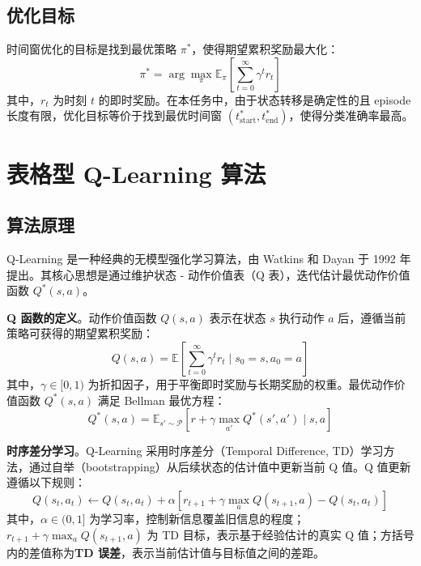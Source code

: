 \subsection{优化目标}
\label{subsec:objective}

时间窗优化的目标是找到最优策略 $\pi^*$，使得期望累积奖励最大化：
\begin{equation}
\pi^* = \arg\max_{\pi} \mathbb{E}_{\pi} \left[ \sum_{t=0}^{\infty} \gamma^t r_t \right]
\end{equation}
其中，$r_t$ 为时刻 $t$ 的即时奖励。在本任务中，由于状态转移是确定性的且 episode 长度有限，优化目标等价于找到最优时间窗 $(t_{\text{start}}^*, t_{\text{end}}^*)$，使得分类准确率最高。

\section{表格型 Q-Learning 算法}
\label{sec:qlearning}

\subsection{算法原理}
\label{subsec:algorithm}

Q-Learning 是一种经典的无模型强化学习算法，由 Watkins 和 Dayan 于 1992 年提出\cite{watkins1992q}。其核心思想是通过维护状态 - 动作价值表（Q 表），迭代估计最优动作价值函数 $Q^*(s, a)$。

\textbf{Q 函数的定义}。动作价值函数 $Q(s, a)$ 表示在状态 $s$ 执行动作 $a$ 后，遵循当前策略可获得的期望累积奖励：
\begin{equation}
Q(s, a) = \mathbb{E} \left[ \sum_{t=0}^{\infty} \gamma^t r_t \mid s_0 = s, a_0 = a \right]
\end{equation}
其中，$\gamma \in [0, 1)$ 为折扣因子，用于平衡即时奖励与长期奖励的权重。最优动作价值函数 $Q^*(s, a)$ 满足 Bellman 最优方程：
\begin{equation}
Q^*(s, a) = \mathbb{E}_{s' \sim \mathcal{P}} \left[ r + \gamma \max_{a'} Q^*(s', a') \mid s, a \right]
\end{equation}

\textbf{时序差分学习}。Q-Learning 采用时序差分（Temporal Difference, TD）学习方法，通过自举（bootstrapping）从后续状态的估计值中更新当前 Q 值。Q 值更新遵循以下规则：
\begin{equation}
Q(s_t, a_t) \leftarrow Q(s_t, a_t) + \alpha \left[ r_{t+1} + \gamma \max_{a} Q(s_{t+1}, a) - Q(s_t, a_t) \right]
\end{equation}
其中，$\alpha \in (0, 1]$ 为学习率，控制新信息覆盖旧信息的程度；$r_{t+1} + \gamma \max_{a} Q(s_{t+1}, a)$ 为 TD 目标，表示基于经验估计的真实 Q 值；方括号内的差值称为\textbf{TD 误差}，表示当前估计值与目标值之间的差距。

